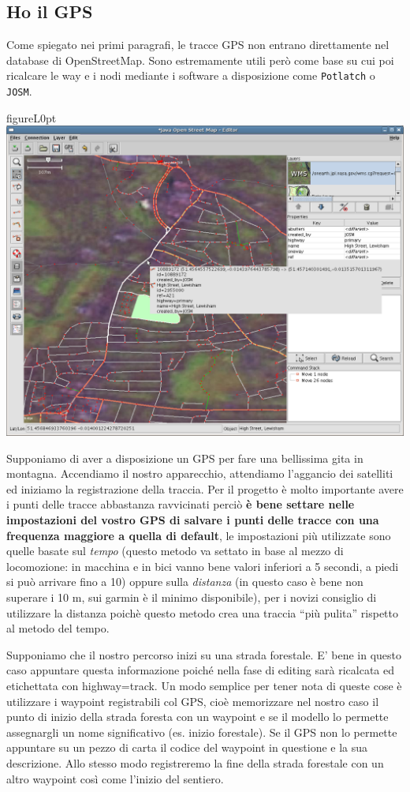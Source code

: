 \documentclass[a4paper,twoside,12pt,]{article}
\newcommand{\osm}{OpenStreetMap\xspace}
\newcommand{\gps}{GPS\xspace}
\begin{document}
\subsection{Ho il \gps}
Come spiegato nei primi paragrafi, le tracce \gps non entrano direttamente nel database di \osm. Sono estremamente utili però come base su cui poi ricalcare le way e i nodi mediante i software a disposizione come \texttt{Potlatch} o \texttt{JOSM}.
\begin{wrapfloat}{figure}{L}{0pt}
 \includegraphics[width=0.6\columnwidth]{Josm-screenshot.png}
 \caption{\textit{L'interfaccia di JOSM}}
\end{wrapfloat}
Supponiamo di aver a disposizione un \gps per fare una bellissima gita in montagna. Accendiamo il nostro apparecchio, attendiamo l'aggancio dei satelliti ed iniziamo la registrazione della traccia. Per il progetto è molto importante avere i punti delle tracce abbastanza ravvicinati perciò \textbf{è bene settare nelle impostazioni del vostro \gps di salvare i punti delle tracce con una frequenza maggiore a quella di default}, le impostazioni più utilizzate sono quelle basate sul \textit{tempo} (questo metodo va settato in base al mezzo di locomozione: in macchina e in bici vanno bene valori inferiori a 5 secondi, a piedi si può arrivare fino a 10) oppure sulla \textit{distanza} (in questo caso è bene non superare i 10 m, sui garmin è il minimo disponibile), per i novizi consiglio di utilizzare la distanza poichè questo metodo crea una traccia ``più pulita'' rispetto al metodo del tempo.

Supponiamo che il nostro percorso inizi su una strada forestale. E' bene in questo caso appuntare questa informazione poiché nella fase di editing sarà ricalcata ed etichettata con highway=track. Un modo semplice per tener nota di queste cose è utilizzare i waypoint registrabili col \gps, cioè memorizzare nel nostro caso il punto di inizio della strada foresta con un waypoint e se il modello lo permette assegnargli un nome significativo (es. inizio forestale). Se il \gps non lo permette appuntare su un pezzo di carta il codice del waypoint in questione e la sua descrizione. Allo stesso modo registreremo la fine della strada forestale con un altro waypoint così come l'inizio del sentiero.
\end{document}
